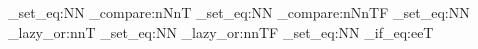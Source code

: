 \ExplSyntaxOn
\cs_set_eq:NN \DimComparenNnT \dim_compare:nNnT
\cs_set_eq:NN \DimComparenNnTF \dim_compare:nNnTF
\cs_set_eq:NN \BoolLazyOrnnT \bool_lazy_or:nnT
\cs_set_eq:NN \BoolLazyOrnnTF \bool_lazy_or:nnTF
\cs_set_eq:NN \TLIfEqeeT \tl_if_eq:eeT
\ExplSyntaxOff

\def\ColorCodeBase{Maroon}
\def\ColorCodeColback{\ColorCodeBase!5}
\def\ColorCodeColbacktitle{\ColorCodeBase!5}
\def\ColorCodeTitle{\ColorCodeBase!70!black}
\def\ColorCodeBorderline{\ColorCodeBase}
\def\ColorCodeLineNumber{\ColorCodeBase}
\def\ColorCodeLineNumberBackground{\ColorCodeBase!20}


